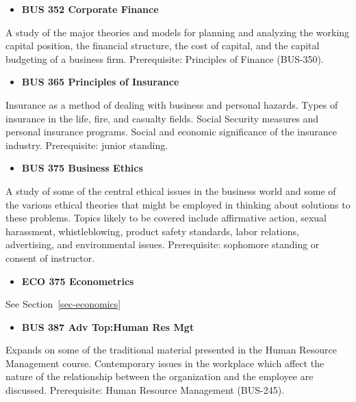 \documentclass[
  letterpaper,
]{scrbook}
\providecommand{\tightlist}{%
  \setlength{\itemsep}{0pt}\setlength{\parskip}{0pt}}
\begin{document}
\begin{itemize}
\tightlist
\item
  \textbf{BUS 352 Corporate Finance}
\end{itemize}

A study of the major theories and models for planning and analyzing the
working capital position, the financial structure, the cost of capital,
and the capital budgeting of a business firm. Prerequisite: Principles
of Finance (BUS-350).

\begin{itemize}
\tightlist
\item
  \textbf{BUS 365 Principles of Insurance}
\end{itemize}

Insurance as a method of dealing with business and personal hazards.
Types of insurance in the life, fire, and casualty fields. Social
Security measures and personal insurance programs. Social and economic
significance of the insurance industry. Prerequisite: junior standing.

\begin{itemize}
\tightlist
\item
  \textbf{BUS 375 Business Ethics}
\end{itemize}

A study of some of the central ethical issues in the business world and
some of the various ethical theories that might be employed in thinking
about solutions to these problems. Topics likely to be covered include
affirmative action, sexual harassment, whistleblowing, product safety
standards, labor relations, advertising, and environmental issues.
Prerequisite: sophomore standing or consent of instructor.

\begin{itemize}
\tightlist
\item
  \textbf{ECO 375 Econometrics}
\end{itemize}

See Section~\ref{sec-economics}

\begin{itemize}
\tightlist
\item
  \textbf{BUS 387 Adv Top:Human Res Mgt}
\end{itemize}

Expands on some of the traditional material presented in the Human
Resource Management course. Contemporary issues in the workplace which
affect the nature of the relationship between the organization and the
employee are discussed. Prerequisite: Human Resource Management
(BUS-245).
\end{document}
